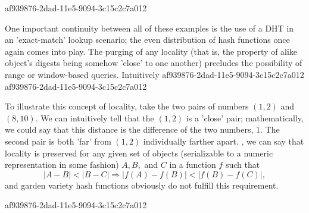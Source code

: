\documentclass[12pt]{article}
\begin{document}
af939876-2dad-11e5-9094-3c15c2c7a012\par One important continuity between all of these examples is the use of a DHT in an 'exact-match' lookup scenario; the even distribution of hash functions once again comes into play. The purging of any locality (that is, the property of alike object's digests being somehow 'close' to one another) precludes the possibility of range or window-based queries. Intuitively
af939876-2dad-11e5-9094-3c15c2c7a012
af939876-2dad-11e5-9094-3c15c2c7a012\par To illustrate this concept of locality, take the two pairs of numbers $(1,2)$ and $(8,10)$. We can intuitively tell that the $(1,2)$ is a 'close' pair; mathematically, we could say that this distance is the difference of the two numbers, $1$. The second pair is both 'far' from $(1,2)$ individually farther apart. , we can say that locality is preserved for any given set of objects (serializable to a numeric representation in some fashion) $A,B,$ and $C$ in a function $f$ such that
\begin{equation}
|A-B| < |B-C| \Rightarrow |f(A)-f(B)| < |f(B) - f(C)|,
\end{equation}
and garden variety hash functions obviously do not fulfill this requirement.

af939876-2dad-11e5-9094-3c15c2c7a012\printbibliography
\end{document}
